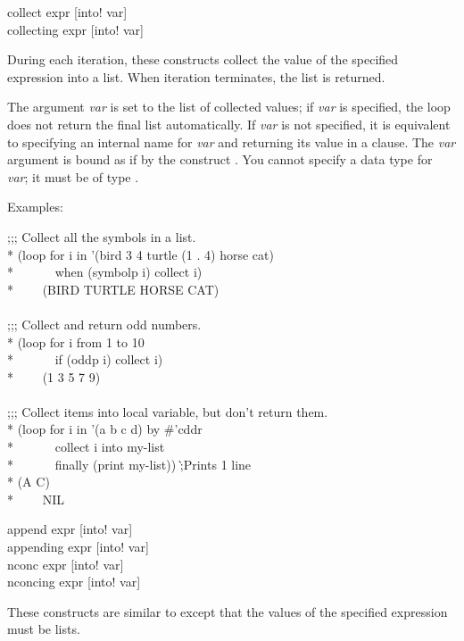 \begin{new}
\begin{defloop}
collect expr [\!into! var] \\
collecting expr [\!into! var]

During each iteration, these constructs collect the value of the specified 
expression into a list. When iteration terminates, the list is returned.

The argument {\it var\/} is 
set to the list of collected values; if {\it var} is specified, the loop
does not return the final list automatically.  If {\it var} is not
specified, it is equivalent to specifying an internal name for
{\it var} and returning its value in a  clause.
The {\it var\/} argument
is bound as if by the construct .
You cannot specify a data type for {\it var\/}; it must be of type .


Examples:
\begin{lisp}
;;; Collect all the symbols in a list. \\*
(loop for i in '(bird 3 4 turtle (1 . 4) horse cat) \\*
~~~~~~when (symbolp i) collect i) \\*
~~~\EV~(BIRD TURTLE HORSE CAT) \\
 \\
;;; Collect and return odd numbers. \\*
(loop for i from 1 to 10 \\*
~~~~~~if (oddp i) collect i) \\*
~~~\EV~(1 3 5 7 9) \\
 \\
;;; Collect items into local variable, but don't return them. \\*
(loop for i in '(a b c d) by \#'cddr \\*
~~~~~~collect i into my-list \\*
~~~~~~finally (print my-list)) \`;{\rm Prints 1 line}\\*
(A C)  \\*
~~~\EV~NIL
\end{lisp}
\end{defloop}

\begin{defloop}
append expr [\!into! var] \\
appending expr [\!into! var] \\
nconc expr [\!into! var] \\
nconcing expr [\!into! var]

These constructs are similar to  except that the
values of the specified expression must be lists.  


\end{defloop}
\end{new}
